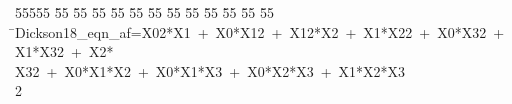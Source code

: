 %
%
\begin{tabbing}
55555 \= 55 \= 55 \= 55 \= 55 \= 55 \= 55 \= 55 \= 55 \= 55 \= 55 \= 55 \= 55 \= \>Dickson18\_eqn\_af=X02*X1\ +\ X0*X12\ +\ X12*X2\ +\ X1*X22\ +\ X0*X32\ +\ X1*X32\ +\ X2*\\[0pt]
\>X32\ +\ X0*X1*X2\ +\ X0*X1*X3\ +\ X0*X2*X3\ +\ X1*X2*X3\\[0pt]
2\>\end{tabbing}
